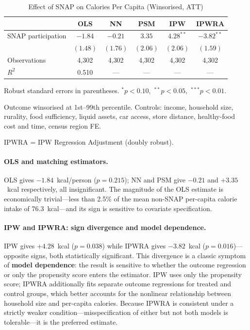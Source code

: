 \documentclass[12pt]{article}
\begin{document}
\begin{table}[H]
\centering
\caption{Effect of SNAP on Calories Per Capita (Winsorised, ATT)}
\label{tab:main}
\begin{threeparttable}
\begin{tabular}{lccccc}
\toprule
 & \textbf{OLS} & \textbf{NN} & \textbf{PSM}
 & \textbf{IPW} & \textbf{IPWRA} \\
\midrule
SNAP participation
  & $-1.84$   & $-0.21$  & $3.35$   & $4.28^{**}$ & $-3.82^{**}$ \\
  & $(1.48)$  & $(1.76)$ & $(2.06)$ & $(2.06)$    & $(1.59)$     \\[3pt]
\midrule
Observations & 4{,}302 & 4{,}302 & 4{,}302 & 4{,}302 & 4{,}302 \\
$R^2$        & 0.510 & --- & --- & --- & --- \\
\bottomrule
\end{tabular}
\begin{tablenotes}
  \small
  \item Robust standard errors in parentheses.
    $^*p<0.10$,\ $^{**}p<0.05$,\ $^{***}p<0.01$.
  \item Outcome winsorised at 1st--99th percentile.
    Controls: income, household size, rurality, food sufficiency,
    liquid assets, car access, store distance, healthy-food cost
    and time, census region FE.
  \item IPWRA = IPW Regression Adjustment (doubly robust).
\end{tablenotes}
\end{threeparttable}
\end{table}

\paragraph{OLS and matching estimators.}
OLS gives $-1.84$~kcal/person ($p=0.215$); NN and PSM give
$-0.21$ and $+3.35$~kcal respectively, all insignificant. The
magnitude of the OLS estimate is economically trivial---less than
2.5\% of the mean non-SNAP per-capita calorie intake of
76.3~kcal---and its sign is sensitive to covariate specification.

\paragraph{IPW and IPWRA: sign divergence and model dependence.}
IPW gives $+4.28$~kcal ($p=0.038$) while IPWRA gives
$-3.82$~kcal ($p=0.016$)---opposite signs, both statistically
significant. This divergence is a classic symptom of
\textbf{model dependence}: the result is sensitive to whether the
outcome regression or only the propensity score enters the
estimator. IPW uses only the propensity score; IPWRA additionally
fits separate outcome regressions for treated and control groups,
which better accounts for the nonlinear relationship between
household size and per-capita calories. Because IPWRA is consistent
under a strictly weaker condition---misspecification of either but
not both models is tolerable---it is the preferred estimate.
\end{document}
